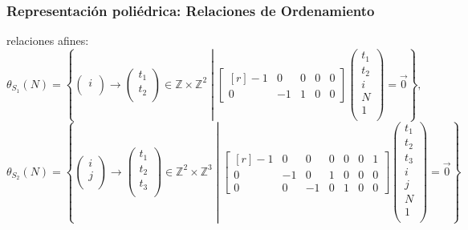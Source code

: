 \documentclass{beamer}\usetheme{Madrid} %
\begin{document}
\begin{frame}
\frametitle{Representación poliédrica: Relaciones de Ordenamiento}
relaciones afines: 
$$
{\scriptstyle
 \theta_{S_1}(N) = 
        \left\{ 
            \left(\begin{matrix}i\\\end{matrix} \right) \to 
            \left(\begin{matrix}t_1 \\ t_2\\\end{matrix} \right) 
            \in \mathbb{Z} \times \mathbb{Z}^2  \middle|
            \begin{bmatrix*}[r] -1 &  0 & 0 &  0 & 0 \\ 
                                0  & -1 & 1 &  0 & 0  \end{bmatrix*} 
            \left( \begin{array}{c} t_1 \\ t_2 \\ i \\ N \\ 1\\ \end{array} \right)
            = \vec{0}
        \right\},
}
$$ 
$$
{\scriptstyle
 \theta_{S_2}(N) = 
        \left\{ 
            \left(\begin{matrix}i \\ j \\\end{matrix} \right) \to 
            \left(\begin{matrix}t_1 \\ t_2 \\ t_3 \\\end{matrix} \right) 
            \in \mathbb{Z}^2 \times \mathbb{Z}^3  \middle|
            \begin{bmatrix*}[r] -1 &  0 &  0 & 0 &  0 & 0 & 1 \\ 
                                0  & -1 &  0 & 1 &  0 & 0 & 0 \\
                                0  &  0 & -1 & 0 &  1 & 0 & 0 \end{bmatrix*} 
            \left( \begin{array}{c} t_1 \\ t_2 \\ t_3 \\ i \\ j \\ N \\ 1\\ \end{array} \right)
            = \vec{0}
        \right\}
}
$$
\end{frame}
\end{document}
